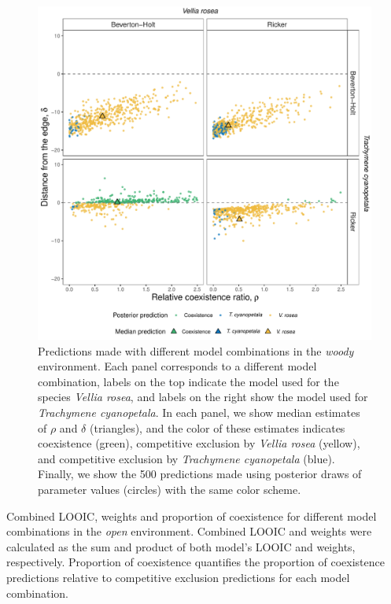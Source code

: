 \begin{refsection}
\begin{figure}[H]
  \centerline{\includegraphics[width=1\textwidth]{figures/chapter3_fig4}}
  \caption[Predictions made with different model combinations in the \textit{woody} environment]{Predictions made with different model combinations in the \textit{woody} environment. Each panel corresponds to a different model combination, labels on the top indicate the model used for the species \textit{Vellia rosea}, and labels on the right show  the model used for \textit{Trachymene cyanopetala}.  In each panel, we show median estimates of $\rho$ and $\delta$ (triangles), and the color of these estimates indicates coexistence (green), competitive exclusion by \textit{Vellia rosea} (yellow), and competitive exclusion by \textit{Trachymene cyanopetala} (blue). Finally, we show the 500 predictions made using posterior draws of parameter values (circles) with the same color scheme.}
    \label{fig:woody}
\end{figure}
\begin{table}[H]
\caption[Combined LOOIC, weights and proportion of coexistence for different model combinations in the \textit{open} environment]{Combined LOOIC, weights and proportion of coexistence for different model combinations in the \textit{open} environment. Combined LOOIC and weights were calculated as the sum and product of both model's LOOIC and weights, respectively. Proportion of coexistence quantifies the proportion of coexistence predictions relative to competitive exclusion predictions for each model combination.}

\end{table}
\end{refsection}
